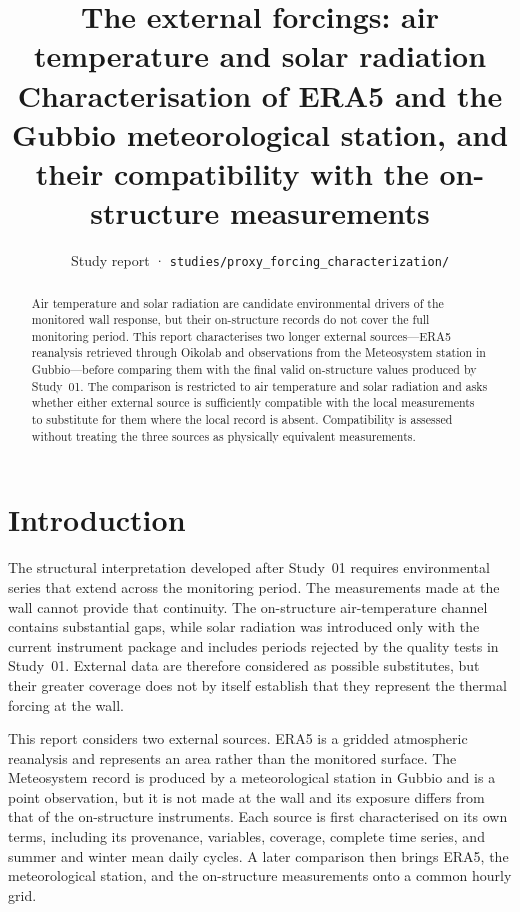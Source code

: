 \documentclass[11pt,a4paper]{article}
\title{\vspace{-1.2cm}\textbf{The external forcings: air temperature and solar
radiation}\\[2mm] \large Characterisation of ERA5 and the Gubbio meteorological station, and their compatibility with the on-structure measurements}
\author{Study report · \texttt{studies/proxy\_forcing\_characterization/}}
\date{}
\begin{document}
\maketitle
\thispagestyle{fancy}

\begin{abstract}
\noindent
Air temperature and solar radiation are candidate environmental drivers of the monitored wall response, but their on-structure records do not cover the full monitoring period. This report characterises two longer external sources---ERA5 reanalysis retrieved through Oikolab and observations from the Meteosystem station in Gubbio---before comparing them with the final valid on-structure values produced by Study~01. The comparison is restricted to air temperature and solar radiation and asks whether either external source is sufficiently compatible with the local measurements to substitute for them where the local record is absent. Compatibility is assessed without treating the three sources as physically equivalent measurements.
\end{abstract}

\tableofcontents

\section{Introduction}
\label{sec:introduction}

The structural interpretation developed after Study~01 requires environmental
series that extend across the monitoring period. The measurements made at the
wall cannot provide that continuity. The on-structure air-temperature channel
contains substantial gaps, while solar radiation was introduced only with the
current instrument package and includes periods rejected by the quality tests in
Study~01. External data are therefore considered as possible substitutes, but
their greater coverage does not by itself establish that they represent the
thermal forcing at the wall.

This report considers two external sources. ERA5 is a gridded atmospheric
reanalysis and represents an area rather than the monitored surface. The
Meteosystem record is produced by a meteorological station in Gubbio and is a
point observation, but it is not made at the wall and its exposure differs from
that of the on-structure instruments. Each source is first characterised on its
own terms, including its provenance, variables, coverage, complete time series,
and summer and winter mean daily cycles. A later comparison then brings ERA5,
the meteorological station, and the on-structure measurements onto a common
hourly grid.
\end{document}
